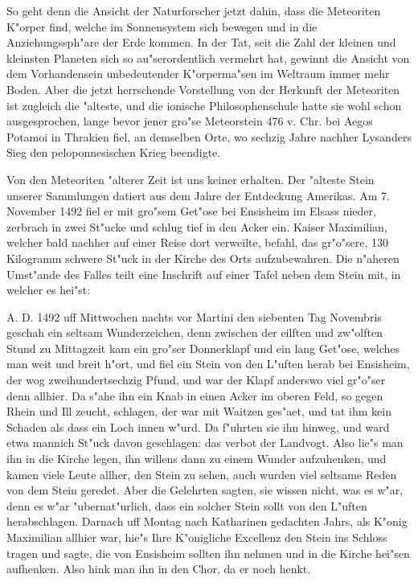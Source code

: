 \documentclass[a4paper, 11pt, oneside]{article}
\begin{document}
So geht denn die Ansicht der Naturforscher jetzt dahin, dass die Meteoriten K"orper find, welche im Sonnensystem sich bewegen und in die Anziehungssph"are der Erde kommen. In der Tat, seit die Zahl der kleinen und kleinsten Planeten sich so au"serordentlich vermehrt hat, gewinnt die Ansicht von dem Vorhandensein unbedeutender K"orperma"sen im Weltraum immer mehr Boden. Aber die jetzt herrschende Vorstellung von der Herkunft der Meteoriten ist zugleich die "alteste, und die ionische Philosophenschule hatte sie wohl schon ausgesprochen, lange bevor jener gro"se Meteorstein 476 v. Chr. bei Aegos Potamoi in Thrakien fiel, an demselben Orte, wo sechzig Jahre nachher Lysanders Sieg den peloponnesischen Krieg beendigte.

Von den Meteoriten "alterer Zeit ist uns keiner erhalten. Der "alteste Stein unserer Sammlungen datiert aus dem Jahre der Entdeckung Amerikas. Am 7. November 1492 fiel er mit gro"sem Get"ose bei Ensisheim im Elsass nieder, zerbrach in zwei St"ucke und schlug tief in den Acker ein. Kaiser Maximilian, welcher bald nachher auf einer Reise dort verweilte, befahl, das gr"o"sere, 130 Kilogramm schwere St"uck in der Kirche des Orts aufzubewahren. Die n"aheren Umst"ande des Falles teilt eine Inschrift auf einer Tafel neben dem Stein mit, in welcher es hei"st:

A. D. 1492 uff Mittwochen nachts vor Martini den siebenten Tag Novembris geschah ein seltsam Wunderzeichen, denn zwischen der eilften und zw"olften Stund zu Mittagzeit kam ein gro"ser Donnerklapf und ein lang Get"ose, welches man weit und breit h"ort, und fiel ein Stein von den L"uften herab bei Ensisheim, der wog zweihundertsechzig Pfund, und war der Klapf anderswo viel gr"o"ser denn allhier. Da s"ahe ihn ein Knab in einen Acker im oberen Feld, so gegen Rhein und Ill zeucht, schlagen, der war mit Waitzen ges"aet, und tat ihm kein Schaden als dass ein Loch innen w"urd. Da f"uhrten sie ihn hinweg, und ward etwa mannich St"uck davon geschlagen: das verbot der Landvogt. Also lie"s man ihn in die Kirche legen, ihn willens dann zu einem Wunder aufzuhenken, und kamen viele Leute allher, den Stein zu sehen, auch wurden viel seltsame Reden von dem Stein geredet. Aber die Gelehrten sagten, sie wissen nicht, was es w"ar, denn es w"ar "ubernat"urlich, dass ein solcher Stein sollt von den L"uften herabschlagen. Darnach uff Montag nach Katharinen gedachten Jahrs, als K"onig Maximilian allhier war, hie"s Ihre K"onigliche Excellenz den Stein ins Schloss tragen und sagte, die von Ensisheim sollten ihn nehmen und in die Kirche hei"sen aufhenken. Also hink man ihn in den Chor, da er noch henkt.
\end{document}
